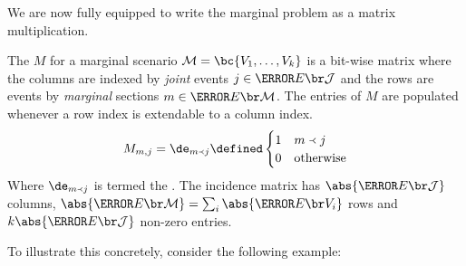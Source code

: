 \documentclass[aps, 10pt, english, twoside, pra, nofootinbib, longbibliography]{revtex4-1}
\begin{document}
    We are now fully equipped to write the marginal problem as a matrix multiplication.
    \begin{definition}
        \label{def:incidence_matrix}
        The  $M$ for a marginal scenario $\mscenario = \bc{V_1, \dots, V_k}$ is a bit-wise matrix where the columns are indexed by \textit{joint} events $j \in \Events{\jointvar}$ and the rows are events by \textit{marginal} sections $m \in \Events{\mscenario}$. The entries of $M$ are populated whenever a row index is extendable to a column index.
        \[ M_{m,j} = \de_{m \ext j} \defined \begin{cases}
            1 & m \ext j \\
            0 & \text{otherwise}
        \end{cases} \]
        Where $\de_{m \ext j}$ is termed the . The incidence matrix has $\abs{\Events{\jointvar}}$ columns, $\abs{\Events{\mscenario}} = \sum_{i} \abs{\Events{V_i}}$ rows and $k\abs{\Events{\jointvar}}$ non-zero entries.
    \end{definition}
    To illustrate this concretely, consider the following example:
\end{document}
